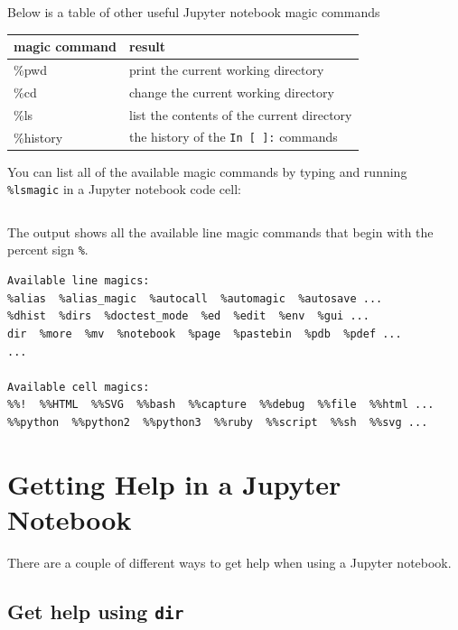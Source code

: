 \documentclass{book}
\begin{document}
    
        Below is a table of other useful Jupyter notebook magic commands

\begin{longtable}[]{@{}ll@{}}
\toprule
magic command & result\tabularnewline
\midrule
\endhead
\%pwd & print the current working directory\tabularnewline
\%cd & change the current working directory\tabularnewline
\%ls & list the contents of the current directory\tabularnewline
\%history & the history of the \lstinline!In [ ]:!
commands\tabularnewline
\bottomrule
\end{longtable}

You can list all of the available magic commands by typing and running
\lstinline!%lsmagic! in a Jupyter notebook code cell:

\begin{lstlisting}[language=Python]
%lsmagic
\end{lstlisting}

The output shows all the available line magic commands that begin with
the percent sign \lstinline!%!.

\begin{lstlisting}
Available line magics:
%alias  %alias_magic  %autocall  %automagic  %autosave ...
%dhist  %dirs  %doctest_mode  %ed  %edit  %env  %gui ...
dir  %more  %mv  %notebook  %page  %pastebin  %pdb  %pdef ...
...

Available cell magics:
%%!  %%HTML  %%SVG  %%bash  %%capture  %%debug  %%file  %%html ...
%%python  %%python2  %%python3  %%ruby  %%script  %%sh  %%svg ...
\end{lstlisting}
    




    
        \section{Getting Help in a Jupyter
Notebook}\label{getting-help-in-a-jupyter-notebook}
    




    
        There are a couple of different ways to get help when using a Jupyter
notebook.
    




    
        \subsection{\texorpdfstring{Get help using
\texttt{dir}}{Get help using dir}}\label{get-help-using-dir}
\end{document}
